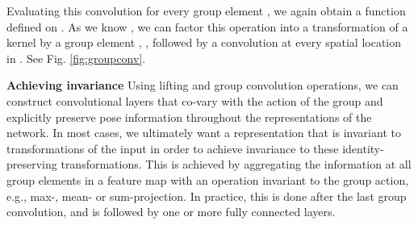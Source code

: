 \documentclass[nohyperref]{article}
\theoremstyle{plain}
\theoremstyle{definition}
\theoremstyle{remark}
\begin{document}
Evaluating this convolution for every group element , we again obtain a function defined on . As we know , we can factor this operation into a transformation of a kernel  by a group element , , followed by a convolution at every spatial location in . See Fig. \ref{fig:groupconv}.

\textbf{Achieving invariance} Using lifting and group convolution operations, we can construct convolutional layers that co-vary with the action of the group and explicitly preserve pose information throughout the representations of the network. In most cases, we ultimately want a representation that is invariant to transformations of the input in order to achieve invariance to these identity-preserving transformations. This is achieved by aggregating the information at all group elements in a feature map with an operation invariant to the group action, e.g., max-, mean- or sum-projection. In practice, this is done after the last group convolution, and is followed by one or more fully connected layers.
\end{document}

